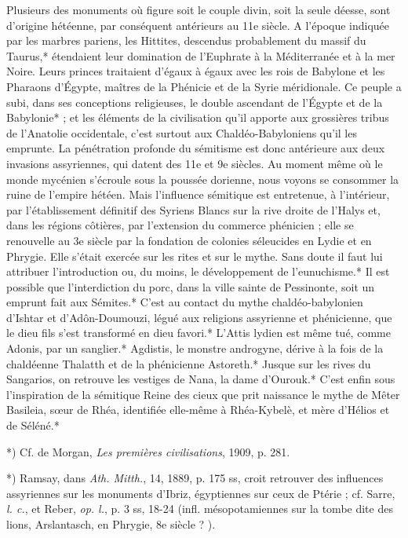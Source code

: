 \documentclass[a4paper, 11pt, oneside, polutonikogreek, french]{article}
\begin{document}
Plusieurs des monuments où figure soit le couple divin, soit la seule déesse, sont d'origine hétéenne, par conséquent antérieurs au 11e siècle. A l'époque indiquée par les marbres pariens, les Hittites, descendus probablement du massif du Taurus,* étendaient leur domination de l'Euphrate à la Méditerranée et à la mer Noire. Leurs princes traitaient d'égaux à égaux avec les rois de Babylone et les Pharaons d'Égypte, maîtres de la Phénicie et de la Syrie méridionale. Ce peuple a subi, dans ses conceptions religieuses, le double ascendant de l'Égypte et de la Babylonie* ; et les éléments de la civilisation qu'il apporte aux grossières tribus de l'Anatolie occidentale, c'est surtout aux Chaldéo-Babyloniens qu'il les emprunte. La pénétration profonde du sémitisme est donc antérieure aux deux invasions assyriennes, qui datent des 11e et 9e siècles. Au moment même où le monde mycénien s'écroule sous la poussée dorienne, nous voyons se consommer la ruine de l'empire hétéen. Mais l'influence sémitique est entretenue, à l'intérieur, par l'établissement définitif des Syriens Blancs sur la rive droite de l'Halys et, dans les régions côtières, par l'extension du commerce phénicien ; elle se renouvelle au 3e siècle par la fondation de colonies séleucides en Lydie et en Phrygie. Elle s'était exercée sur les rites et sur le mythe. Sans doute il faut lui attribuer l'introduction ou, du moins, le développement de l'eunuchisme.* Il est possible que l'interdiction du porc, dans la ville sainte de Pessinonte, soit un emprunt fait aux Sémites.* C'est au contact du mythe chaldéo-babylonien d'Ishtar et d'Adôn-Doumouzi, légué aux religions assyrienne et phénicienne, que le dieu fils s'est transformé en dieu favori.* L'Attis lydien est même tué, comme Adonis, par un sanglier.* Agdistis, le monstre androgyne, dérive à la fois de la chaldéenne Thalatth et de la phénicienne Astoreth.* Jusque sur les rives du Sangarios, on retrouve les vestiges de Nana, la dame d'Ourouk.* C'est enfin sous l'inspiration de la sémitique Reine des cieux que prit naissance le mythe de Mêter Basileia, sœur de Rhéa, identifiée elle-même à Rhéa-Kybelè, et mère d'Hélios et de Séléné.*

*) Cf. de Morgan, \emph{Les premières civilisations}, 1909, p. 281.

*) Ramsay, dans \emph{Ath. Mitth.}, 14, 1889, p. 175 ss, croit retrouver des influences assyriennes sur les monuments d'Ibriz, égyptiennes sur ceux de Ptérie ; cf. Sarre, \emph{l. c.}, et Reber, \emph{op. l.}, p. 3 ss, 18-24 (infl. mésopotamiennes sur la tombe dite des lions, Arslantasch, en Phrygie, 8e siècle ? ).
\end{document}
